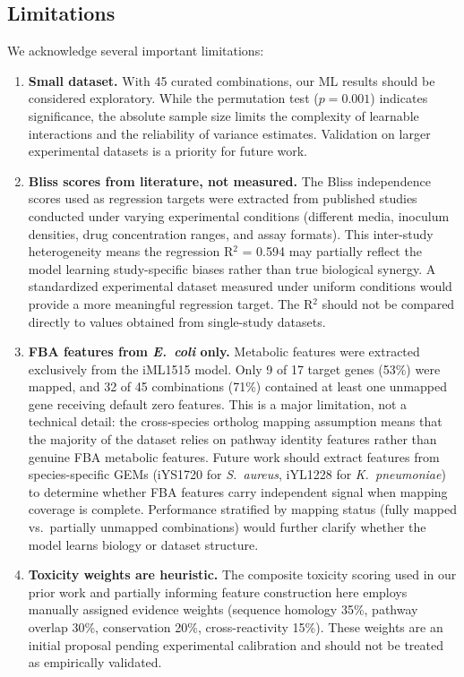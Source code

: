 \documentclass[12pt,a4paper]{article}
\begin{document}
\subsection{Limitations}

We acknowledge several important limitations:

\begin{enumerate}
    \item \textbf{Small dataset.} With 45 curated combinations, our ML results should be considered exploratory. While the permutation test ($p = 0.001$) indicates significance, the absolute sample size limits the complexity of learnable interactions and the reliability of variance estimates. Validation on larger experimental datasets \citep{brochado2018} is a priority for future work.

    \item \textbf{Bliss scores from literature, not measured.} The Bliss independence scores used as regression targets were extracted from published studies conducted under varying experimental conditions (different media, inoculum densities, drug concentration ranges, and assay formats). This inter-study heterogeneity means the regression R$^2$ = 0.594 may partially reflect the model learning study-specific biases rather than true biological synergy. A standardized experimental dataset measured under uniform conditions would provide a more meaningful regression target. The R$^2$ should not be compared directly to values obtained from single-study datasets.

    \item \textbf{FBA features from \textit{E.\ coli} only.} Metabolic features were extracted exclusively from the iML1515 model. Only 9 of 17 target genes (53\%) were mapped, and 32 of 45 combinations (71\%) contained at least one unmapped gene receiving default zero features. This is a major limitation, not a technical detail: the cross-species ortholog mapping assumption means that the majority of the dataset relies on pathway identity features rather than genuine FBA metabolic features. Future work should extract features from species-specific GEMs (iYS1720 for \textit{S.\ aureus}, iYL1228 for \textit{K.\ pneumoniae}) to determine whether FBA features carry independent signal when mapping coverage is complete. Performance stratified by mapping status (fully mapped vs.\ partially unmapped combinations) would further clarify whether the model learns biology or dataset structure.

    \item \textbf{Toxicity weights are heuristic.} The composite toxicity scoring used in our prior work \citep{kang2026} and partially informing feature construction here employs manually assigned evidence weights (sequence homology 35\%, pathway overlap 30\%, conservation 20\%, cross-reactivity 15\%). These weights are an initial proposal pending experimental calibration and should not be treated as empirically validated.


\end{enumerate}
\end{document}
